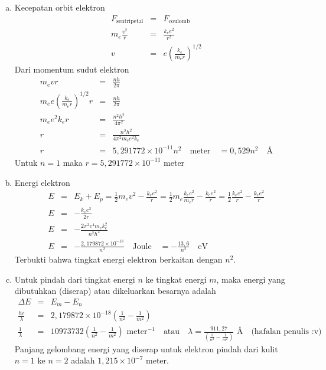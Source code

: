 \documentclass[11pt,fleqn]{exam}
\begin{document}
\begin{questions}
\begin{enumerate}[a.]
	\item Kecepatan orbit elektron
	\begin{eqnarray*}
	F_\text{sentripetal} &=& F_\text{coulomb}\\
	m_e \frac{v^2}{r} &=& \frac{k_e e^2}{r^2}\\
	v &=& e \left( \frac{k_e}{m_e r}\right)^{1/2}
	\end{eqnarray*}
	Dari momentum sudut elektron
	\begin{eqnarray*}
	m_e v r &=& \frac{nh}{2\pi}\\
	m_e e \left( \frac{k_e}{m_e r}\right)^{1/2} r &=& \frac{nh}{2\pi}\\
	m_e e^2 k_e r &=& \frac{n^2h^2}{4\pi^2}\\
	r &=& \frac{n^2h^2}{4\pi^2 m_e e^2 k_e}\\
	r &=& 5,291772 \times 10^{-11} n^2 \quad \text{meter} \quad = 0,529 n^2 \quad \text{\AA}
	\end{eqnarray*}
	Untuk $n=1$ maka $r = 5,291772 \times 10^{-11}$ meter
	\item Energi elektron
	\begin{eqnarray*}
	E &=& E_k + E_p = \frac{1}{2} m_e v^2 - \frac{k_e e^2}{r} = \frac{1}{2} m_e \frac{k_e e^2}{m_e r} - \frac{k_e e^2}{r} = \frac{1}{2} \frac{k_e e^2}{r} - \frac{k_e e^2}{r}\\
	E &=& -\frac{k_e e^2}{2r}\\
	E &=& -\frac{2\pi^2 e^4 m_e k_e^2}{n^2 h^2}\\
	E &=& - \frac{2,179872 \times 10^{-18}}{n^2} \quad \text{Joule} \quad = - \frac{13,6}{n^2} \quad \text{eV} 
	\end{eqnarray*}
	Terbukti bahwa tingkat energi elektron berkaitan dengan $n^2$.
	\item Untuk pindah dari tingkat energi $n$ ke tingkat energi $m$, maka energi yang dibutuhkan (diserap) atau dikeluarkan besarnya adalah
	\begin{eqnarray*}
		\Delta E &=& E_m - E_n\\
		\frac{hc}{\lambda} &=& 2,179872 \times 10^{-18} \left( \frac{1}{n^2} - \frac{1}{m^2} \right) \\
		\frac{1}{\lambda} &=& 10973732 \left( \frac{1}{n^2} - \frac{1}{m^2} \right) \text{  meter}^{-1} \quad \text{atau} \quad \lambda = \frac{911,27}{\left( \frac{1}{n^2} - \frac{1}{m^2} \right)} \text{  \AA} \quad \text{(hafalan penulis :v)}
	\end{eqnarray*}
	Panjang gelombang energi yang diserap untuk elektron pindah dari kulit $n=1$ ke $n=2$ adalah $1,215 \times 10^{-7}$ meter.
\end{enumerate}



\end{questions}
\end{document}

